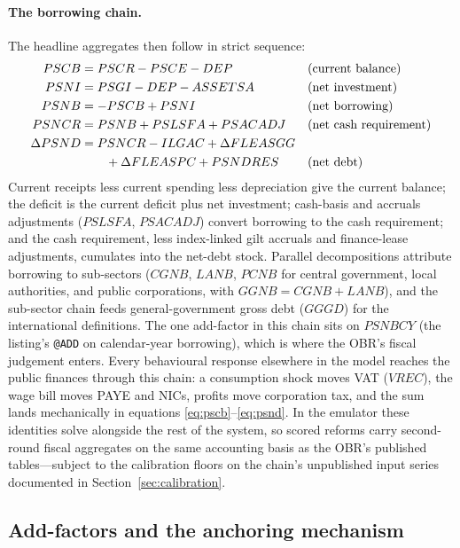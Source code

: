 \paragraph{The borrowing chain.} The headline aggregates then follow in strict sequence:
\begin{align}
PSCB &= PSCR - PSCE - DEP && \text{(current balance)} \label{eq:pscb}\\
PSNI &= PSGI - DEP - ASSETSA && \text{(net investment)} \label{eq:psni}\\
PSNB &= -PSCB + PSNI && \text{(net borrowing)} \label{eq:psnb}\\
PSNCR &= PSNB + PSLSFA + PSACADJ && \text{(net cash requirement)} \label{eq:psncr}\\
\Delta PSND &= PSNCR - ILGAC + \Delta FLEASGG \notag\\
&\qquad + \Delta FLEASPC + PSNDRES && \text{(net debt)} \label{eq:psnd}
\end{align}
Current receipts less current spending less depreciation give the current balance; the deficit is the current deficit plus net investment; cash-basis and accruals adjustments ($PSLSFA$, $PSACADJ$) convert borrowing to the cash requirement; and the cash requirement, less index-linked gilt accruals and finance-lease adjustments, cumulates into the net-debt stock. Parallel decompositions attribute borrowing to sub-sectors ($CGNB$, $LANB$, $PCNB$ for central government, local authorities, and public corporations, with $GGNB = CGNB + LANB$), and the sub-sector chain feeds general-government gross debt ($GGGD$) for the international definitions. The one add-factor in this chain sits on $PSNBCY$ (the listing's \texttt{@ADD} on calendar-year borrowing), which is where the OBR's fiscal judgement enters. Every behavioural response elsewhere in the model reaches the public finances through this chain: a consumption shock moves VAT ($VREC$), the wage bill moves PAYE and NICs, profits move corporation tax, and the sum lands mechanically in equations \eqref{eq:pscb}--\eqref{eq:psnd}. In the emulator these identities solve alongside the rest of the system, so scored reforms carry second-round fiscal aggregates on the same accounting basis as the OBR's published tables---subject to the calibration floors on the chain's unpublished input series documented in Section~\ref{sec:calibration}.

\subsection{Add-factors and the anchoring mechanism}
\label{sec:anchoring}

